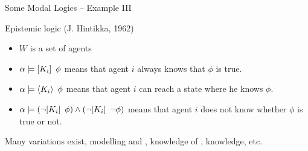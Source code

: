 \documentclass[aspectratio=169]{beamer}
\begin{document}
\begin{slide}{Some Modal Logics -- Example III}\label{s:19}
\small
\begin{block}{Epistemic logic (J. Hintikka, 1962)}
\begin{itemize}
\item $W$ is a set of agents 
\item $\alpha \models [K_i]\,~\phi$ means that agent $i$ always knows that $\phi$ is true.
\item $\alpha \models \langle K_i \rangle\,~\phi$ means that agent $i$ can reach a state where he knows $\phi$.
\item $\alpha \models (\lnot [K_i]\,~\phi) \land (\lnot [K_i]\,~\lnot \phi)$ means that agent $i$ does not know whether $\phi$ is true or not.
\end{itemize}
\end{block}

Many variations exist, modelling  and , knowledge of ,  knowledge, etc.

\end{slide}
\end{document}
